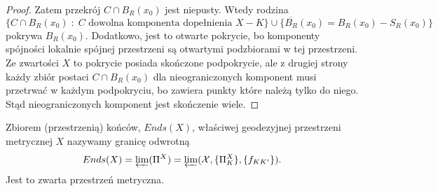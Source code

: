 \begin{example}[m]
\begin{proof}
      Zatem przekrój $C\cap B_R(x_0)$ jest niepusty. Wtedy rodzina 
      $$\{C\cap B_R(x_0)\;:\;C\text{ dowolna komponenta dopełnienia }X-K\}\cup \{\overline{B_R}(x_0)=B_R(x_0)-S_R(x_0)\}$$
      pokrywa $B_R(x_0)$. Dodatkowo, jest to otwarte pokrycie, bo komponenty spójności lokalnie spójnej przestrzeni są otwartymi podzbiorami w tej przestrzeni. Ze zwartości $X$ to pokrycie posiada skończone podpokrycie, ale z drugiej strony każdy zbiór postaci $C\cap B_R(x_0)$ dla nieograniczonych komponent musi przetrwać w każdym podpokryciu, bo zawiera punkty które należą tylko do niego. Stąd nieograniczonych komponent jest skończenie wiele.
    \end{proof}
\end{example}

\begin{definition}{}{}
  Zbiorem (przestrzenią) końców, $Ends(X)$, właściwej geodezyjnej przestrzeni metrycznej $X$ nazywamy granicę odwrotną
  $$Ends(X)=\varprojlim(\Pi^X)=\varprojlim(\mathcal{X}, \{\Pi_K^X\}, \{f_{KK'}\}).$$
  Jest to zwarta przestrzeń metryczna.
\end{definition}



